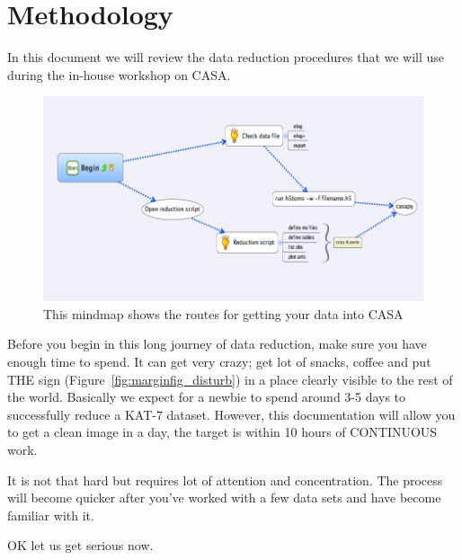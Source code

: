 \documentclass[force,almostfull,justified]{tufte-book}
\begin{document}


\section{Methodology}

In this document we will review the data reduction procedures that we will use during the in-house
workshop on CASA.

\begin{figure}
  \includegraphics[width=12cm]{images/casa_begin}
  \caption[Mind map.]{This mindmap shows the routes for getting your data into CASA}
  \forceversofloat
  \label{fig:casa_begin}
\end{figure}

Before you begin in this long journey of data reduction, make sure you have enough time to spend. It
can get very crazy; get lot of snacks, coffee and put THE sign (Figure~\ref{fig:marginfig_disturb}) in
a place clearly visible to the rest of the world. Basically we expect for a newbie to spend around 3-5
days to successfully reduce a KAT-7 dataset.  However, this documentation will allow you to get a
clean image in a day, the target is within 10 hours of CONTINUOUS work.

It is not that hard but requires lot of attention and concentration. The process will become quicker
after you've worked with a few data sets and have become familiar with it.

OK let us get serious now.
\end{document}
